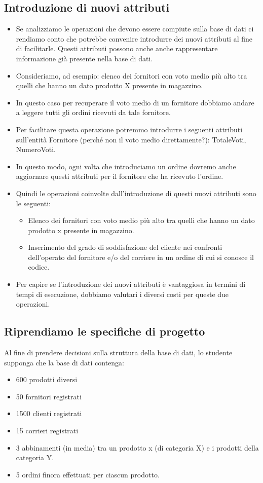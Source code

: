 \subsection{Introduzione di nuovi attributi}
\begin{itemize}
	\item Se analizziamo le operazioni che devono essere compiute sulla base di dati ci rendiamo conto che potrebbe convenire introdurre dei nuovi attributi al fine di
	facilitarle. Questi attributi possono anche anche rappresentare informazione già presente nella base di dati.
	\item Consideriamo, ad esempio: elenco dei fornitori con voto medio più alto tra quelli che hanno un dato prodotto X presente in magazzino.
	\item In questo caso per recuperare il voto medio di un fornitore dobbiamo andare a leggere tutti gli ordini ricevuti da tale fornitore.
	\item Per facilitare questa operazione potremmo introdurre i seguenti attributi sull’entità Fornitore (perché non il voto medio direttamente?): TotaleVoti, NumeroVoti.
	\item In questo modo, ogni volta che introduciamo un ordine dovremo anche aggiornare questi attributi per il fornitore che ha ricevuto l’ordine.
	\item Quindi le operazioni coinvolte dall’introduzione di questi
	nuovi attributi sono le seguenti:
	\begin{itemize}
		\item Elenco dei fornitori con voto medio più alto tra quelli
		che hanno un dato prodotto x presente in magazzino.
		\item Inserimento del grado di soddisfazione del cliente
		nei confronti dell’operato del fornitore e/o del
		corriere in un ordine di cui si conosce il codice.
	\end{itemize}
	\item Per capire se l’introduzione dei nuovi attributi è
	vantaggiosa in termini di tempi di esecuzione, dobbiamo
	valutari i diversi costi per queste due operazioni.
\end{itemize}
\subsection{Riprendiamo le specifiche di progetto}
Al fine di prendere decisioni sulla struttura della base di dati, lo studente supponga che la base di dati
contenga:
\begin{itemize}
	\item 600 prodotti diversi
	\item 50 fornitori registrati
	\item 1500 clienti registrati
	\item 15 corrieri registrati
	\item 3 abbinamenti (in media) tra un prodotto x (di categoria X) e i prodotti della categoria Y.
	\item 5 ordini finora effettuati per ciascun prodotto.
\end{itemize}
